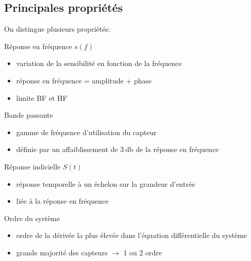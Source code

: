 \subsection{Principales propriétés}
On distingue plusieurs propriétés:
\begin{description}
	\item Réponse en fréquence \(s(f)\)
	\begin{itemize}
		\item variation de la sensibilité en fonction de la fréquence
		\item réponse en fréquence = amplitude + phase
		\item limite BF et HF
	\end{itemize}
	\item Bande passante
	\begin{itemize}
		\item gamme de fréquence d'utilisation du capteur
		\item définie par un affaiblissement de \(\SI{3}{\decibel}\) de la réponse en fréquence
	\end{itemize}
	\item Réponse indicielle \(S(t)\)
	\begin{itemize}
		\item réponse temporelle à un échelon sur la grandeur d'entrée
		\item liée à la réponse en fréquence
	\end{itemize}
	\item Ordre du système
	\begin{itemize}
		\item ordre de la dérivée la plus élevée dans l'équation différentielle du système
		\item grande majorité des capteurs \(\rightarrow\) 1 ou 2 ordre
	\end{itemize}
\end{description}
